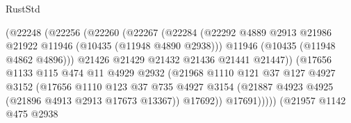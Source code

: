 \begin{lexlean}{RustStd}
\begin{coremodule}
                                    (@22248
                                      (@22256
                                        (@22260
                                          (@22267
                                            (@22284
                                              (@22292
                                                @4889
                                                @2913
                                                @21986
                                                @21922
                                                @11946
                                                (@10435 (@11948 @4890 @2938)))
                                              @11946
                                              (@10435 (@11948 @4862 @4896)))
                                            @21426
                                            @21429
                                            @21432
                                            @21436
                                            @21441
                                            @21447))
                                        (@17656
                                          @1133
                                          @115
                                          @474
                                          @11
                                          @4929
                                          @2932
                                          (@21968
                                            @1110
                                            @121
                                            @37
                                            @127
                                            @4927
                                            @3152
                                            (@17656
                                              @1110
                                              @123
                                              @37
                                              @735
                                              @4927
                                              @3154
                                              (@21887
                                                @4923
                                                @4925
                                                (@21896 @4913 @2913 @17673 @13367))
                                              @17692))
                                          @17691)))))
                                (@21957
                                  @1142
                                  @475
                                  @2938

\end{coremodule}
\end{lexlean}
